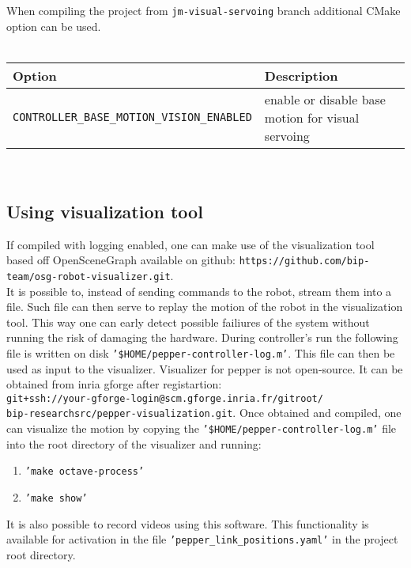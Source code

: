 \noindent When compiling the project from \texttt{jm-visual-servoing} branch additional CMake option can be used. \\ \\
\begin{tabular}{|l|p{5cm}|}
\hline
Option & Description \\
\hline
\texttt{CONTROLLER\_BASE\_MOTION\_VISION\_ENABLED} & enable or disable base motion for visual servoing \\
\hline
\end{tabular} \\

\subsection{Using visualization tool}
\noindent If compiled with logging enabled, one can make use of the visualization tool based off OpenSceneGraph
available on github: \texttt{https://github.com/bip-team/osg-robot-visualizer.git}. \\
\noindent It is possible to, instead of sending commands to the robot, stream them into a file. Such file can then serve
to replay the motion of the robot in the visualization tool. This way one can early detect possible failiures of the
system without running the risk of damaging the hardware. During controller's run the following file is written
on disk \texttt{'\$HOME/pepper-controller-log.m'}. This file can then be used as input to the visualizer.
Visualizer for pepper is not open-source. It can be obtained from inria gforge after registartion:\\
\texttt{git+ssh://your-gforge-login@scm.gforge.inria.fr/gitroot/ \\ bip-researchsrc/pepper-visualization.git}. Once
obtained and compiled, one can visualize the motion by copying the \texttt{'\$HOME/pepper-controller-log.m'} file
into the root directory of the visualizer and running:

\begin{enumerate}
\item \texttt{'make octave-process'} 
\item \texttt{'make show'} 
\end{enumerate}

\noindent It is also possible to record videos using this software. This functionality is available for activation in
the file \texttt{'pepper\_link\_positions.yaml'} in the project root directory.
